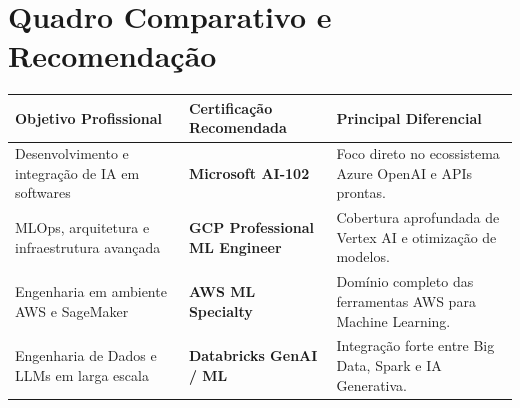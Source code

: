 \documentclass[11pt, a4paper]{article}
\begin{document}
\vspace{1.5em}

\section*{\color{primary}Quadro Comparativo e Recomendação}

\begin{table}[h]
\centering
\small
\begin{tabular}{p{4.5cm} p{4cm} p{5.5cm}}
\toprule
\textbf{Objetivo Profissional} & \textbf{Certificação Recomendada} & \textbf{Principal Diferencial} \\
\midrule
Desenvolvimento e integração de IA em softwares & \textbf{Microsoft AI-102} & Foco direto no ecossistema Azure OpenAI e APIs prontas. \\
\addlinespace
MLOps, arquitetura e infraestrutura avançada & \textbf{GCP Professional ML Engineer} & Cobertura aprofundada de Vertex AI e otimização de modelos. \\
\addlinespace
Engenharia em ambiente AWS e SageMaker & \textbf{AWS ML Specialty} & Domínio completo das ferramentas AWS para Machine Learning. \\
\addlinespace
Engenharia de Dados e LLMs em larga escala & \textbf{Databricks GenAI / ML} & Integração forte entre Big Data, Spark e IA Generativa. \\
\bottomrule
\end{tabular}
\end{table}
\end{document}
